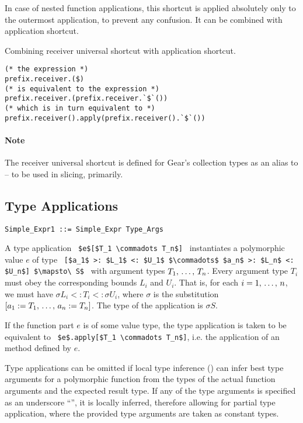 In case of nested function applications, this shortcut is applied absolutely only to the outermost application, to prevent any confusion. It can be combined with application shortcut.

\example Combining receiver universal shortcut with application shortcut.
\begin{lstlisting}[mathescape=false]
(* the expression *)
prefix.receiver.($)
(* is equivalent to the expression *)
prefix.receiver.(prefix.receiver.`$`())
(* which is in turn equivalent to *)
prefix.receiver().apply(prefix.receiver().`$`())
\end{lstlisting}

\paragraph{Note}
The receiver universal shortcut is defined for Gear's collection types as an alias to  -- to be used in slicing, primarily.





\subsection{Type Applications}
\label{sec:type-applications}

\syntax\begin{lstlisting}
Simple_Expr1 ::= Simple_Expr Type_Args
\end{lstlisting}

A type application ~\lstinline!$e$[$T_1 \commadots T_n$]!~ instantiates a polymorphic value $e$ of type ~\lstinline![$a_1$ >: $L_1$ <: $U_1$ $\commadots$ $a_n$ >: $L_n$ <: $U_n$] $\mapsto\ S$!~ with argument types $T_1 ,\, \ldots ,\, T_n$. Every argument type $T_i$ must obey the corresponding bounds $L_i$ and $U_i$. That is, for each $i = 1 ,\, \ldots ,\, n$, we must have $\sigma L_i <: T_i <: \sigma U_i$, where $\sigma$ is the substitution $[a_1 := T_1 ,\, \ldots ,\, a_n := T_n]$. The type of the application is $\sigma S$. 

If the function part $e$ is of some value type, the type application is taken to be equivalent to ~\lstinline!$e$.apply[$T_1 \commadots T_n$]!, i.e. the application of an  method defined by $e$. 

Type applications can be omitted if local type inference () can infer best type arguments for a polymorphic function from the types of the actual function arguments and the expected result type. If any of the type arguments is specified as an underscore ``\code{_}'', it is locally inferred, therefore allowing for partial type application, where the provided type arguments are taken as constant types. 





